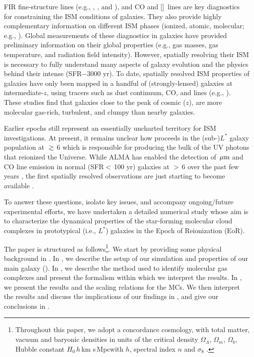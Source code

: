 \IfFileExists{emulateapjlegacy.cls}{\documentclass[iop]{emulateapjlegacy}}{\documentclass[iop]{emulateapj}}
\begin{document}
FIR fine-structure lines (e.g., \cii, \nii, and \oiii), and CO and [\ci]~lines are key diagnostics for constraining the ISM conditions of galaxies. They also provide highly complementary information on different ISM phases (ionized, atomic, molecular; e.g., \citealt{Scoville74a, Rubin85a, Malhotra01a}).
%
Global measurements of these diagnostics in \highz galaxies have provided preliminary information on their global properties (e.g., gas masses, gas temperature, and radiation field intensity). However, spatially resolving their ISM is necessary to fully understand many aspects of galaxy evolution and the physics behind their intense \SF (SFR$-$3000\,\Msun\,yr\pmOne).
%
To date, spatially resolved ISM properties of \highz galaxies have only been mapped in a handful of (strongly-lensed) galaxies at intermediate-$z$, using tracers such as dust continuum, CO, and \cii lines (e.g., \citealt{Swinbank11a, Hodge15a, Ferkinhoff15a, Hodge16a, Leung19a}). These studies find that galaxies close to the peak of cosmic \SF ($z$), are more molecular gas-rich, turbulent, and clumpy than nearby galaxies.

Earlier epochs still represent an essentially uncharted territory for ISM investigations. At present, it remains unclear how \SF proceeds in the (sub-)$L^*$ galaxy population at \z$\gtrsim$\,6  which is responsible for producing the bulk of the UV photons that reionized the Universe.
%
While ALMA has enabled the detection of \,$\mbox{$\mu$m}$ and CO line emission in normal (SFR$<$\,100\,\Msun\,yr\pmOne) galaxies at \z$>$\,6 over the past few years \citep[e.g.,][]{Carniani18b, Odorico18a}, the first spatially resolved observations are just starting to become available \citep{Smit18a,Jones17a}. 

To answer these questions, isolate key issues, and  accompany ongoing/future experimental efforts, we have undertaken a detailed numerical study whose aim is to characterize the dynamical properties of the star-forming molecular cloud complexes in prototypical (i.e., $L^*$) galaxies in the Epoch of Reionization (EoR). 

The paper is structured as follows\footnote{Throughout this paper, we adopt a concordance cosmology, with total matter, vacuum and baryonic densities in units of the critical density $\Omega_{\Lambda}$, $\Omega_m$, $\Omega_b$, Hubble constant $H_0$\,$h$\,km s\pmOne\,Mpc\pmOne with $h$, spectral index $n$ and $\sigma_8$ \citep{Planck14a}.}. We start by providing some physical background in . In , we describe the setup of our simulation and properties of our main galaxy (\flower). In , we describe the method used to identify molecular gas complexes and present the formalism within which we interpret the results. In , we present the results and the scaling relations for the MCs. We then interpret the results and discuss the implications of our findings in , and give our conclusions in .
%
\end{document}
